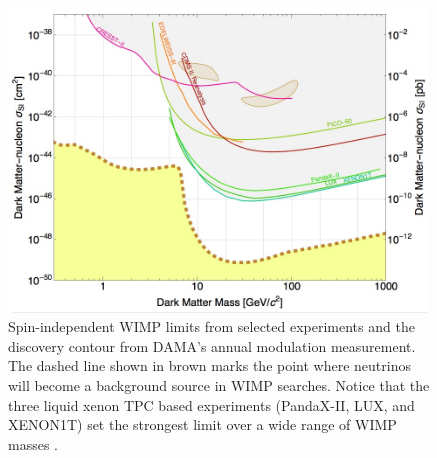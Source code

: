 \begin{figure}[t]
	\centering
	\includegraphics[width=0.99\textwidth]{dm_si_limits}
	\caption{Spin-independent WIMP limits from selected experiments and the discovery contour from DAMA's annual modulation measurement.  The dashed line shown in brown marks the point where neutrinos will become a background source in WIMP searches.  Notice that the three liquid xenon TPC based experiments (PandaX-II, LUX, and XENON1T) set the strongest limit over a wide range of WIMP masses \cite{agnese2015improved, armengaud2016constraints, savage2009compatibility, amole2017dark, tan2016dark, akerib2017results, aprile2017first, angloher2016results, ruppin2014complementarity}.}
	\label{fig:dm_si_limits}
\end{figure}




